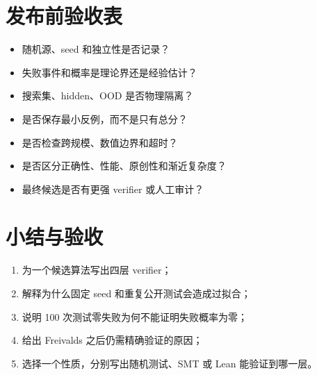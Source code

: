 \section{发布前验收表}

\begin{itemize}
  \item 随机源、seed 和独立性是否记录？
  \item 失败事件和概率是理论界还是经验估计？
  \item 搜索集、hidden、OOD 是否物理隔离？
  \item 是否保存最小反例，而不是只有总分？
  \item 是否检查跨规模、数值边界和超时？
  \item 是否区分正确性、性能、原创性和渐近复杂度？
  \item 最终候选是否有更强 verifier 或人工审计？
\end{itemize}

\section{小结与验收}

\begin{checkpointbox}
\begin{enumerate}
  \item 为一个候选算法写出四层 verifier；
  \item 解释为什么固定 seed 和重复公开测试会造成过拟合；
  \item 说明 100 次测试零失败为何不能证明失败概率为零；
  \item 给出 Freivalds 之后仍需精确验证的原因；
  \item 选择一个性质，分别写出随机测试、SMT 或 Lean 能验证到哪一层。
\end{enumerate}
\end{checkpointbox}
